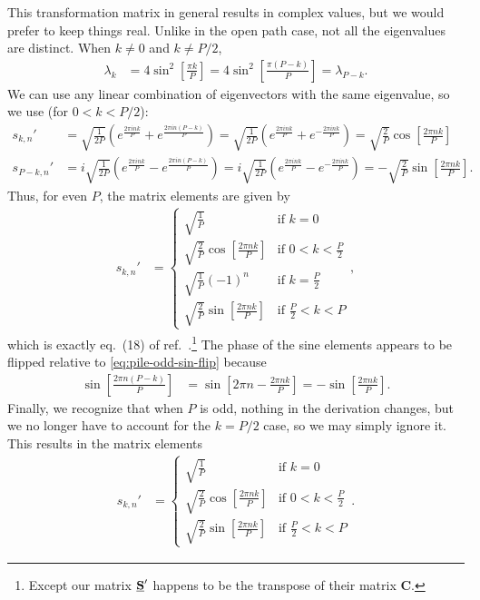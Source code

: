 This transformation matrix in general results in complex values, but we would prefer to keep things real.
Unlike in the open path case, not all the eigenvalues are distinct.
When $k \ne 0$ and $k \ne P/2$,
\begin{align}
	\lambda_k
	&= 4 \sin^2{\left[ \frac{\pi k}{P} \right]}
	= 4 \sin^2{\left[ \frac{\pi (P - k)}{P} \right]}
	= \lambda_{P-k}.
\end{align}
We can use any linear combination of eigenvectors with the same eigenvalue, so we use (for $0 < k < P/2$):
\begin{subequations}
\begin{align}
	s_{k,n}'
	&= \sqrt{\frac{1}{2 P}} \left( e^{\frac{2 \pi i n k}{P}} + e^{\frac{2 \pi i n (P - k)}{P}} \right)
	= \sqrt{\frac{1}{2 P}} \left( e^{\frac{2 \pi i n k}{P}} + e^{-\frac{2 \pi i n k}{P}} \right)
	= \sqrt{\frac{2}{P}} \cos{\left[ \frac{2 \pi n k}{P} \right]} \\
	s_{P-k,n}'
	&= i \sqrt{\frac{1}{2 P}} \left( e^{\frac{2 \pi i n k}{P}} - e^{\frac{2 \pi i n (P - k)}{P}} \right)
	= i \sqrt{\frac{1}{2 P}} \left( e^{\frac{2 \pi i n k}{P}} - e^{-\frac{2 \pi i n k}{P}} \right)
	= -\sqrt{\frac{2}{P}} \sin{\left[ \frac{2 \pi n k}{P} \right]}.
			\label{eq:pile-odd-sin-flip}
\end{align}
\end{subequations}
Thus, for even $P$, the matrix elements are given by
\begin{align}
	s_{k,n}'
	&= \begin{cases}
			\sqrt{\frac{1}{P}} & \text{if } k = 0 \\
			\sqrt{\frac{2}{P}} \cos{\left[ \frac{2 \pi n k}{P} \right]} & \text{if } 0 < k < \frac{P}{2} \\
			\sqrt{\frac{1}{P}} (-1)^n & \text{if } k = \frac{P}{2} \\
			\sqrt{\frac{2}{P}} \sin{\left[ \frac{2 \pi n k}{P} \right]} & \text{if } \frac{P}{2} < k < P
		\end{cases},
\end{align}
which is exactly eq.~(18) of ref.~\cite{ceriotti2010efficient}.\footnote{
	Except our matrix $\underline{\bm{\mathbf{S}}}'$ happens to be the transpose of their matrix $\mathbf{C}$.
}
The phase of the sine elements appears to be flipped relative to \cref{eq:pile-odd-sin-flip} because
\begin{align}
	\sin{\left[ \frac{2 \pi n (P - k)}{P} \right]}
	&= \sin{\left[ 2 \pi n - \frac{2 \pi n k}{P} \right]}
	= -\sin{\left[ \frac{2 \pi n k}{P} \right]}.
\end{align}
Finally, we recognize that when $P$ is odd, nothing in the derivation changes, but we no longer have to account for the $k = P/2$ case, so we may simply ignore it.
This results in the matrix elements
\begin{align}
	s_{k,n}'
	&= \begin{cases}
			\sqrt{\frac{1}{P}} & \text{if } k = 0 \\
			\sqrt{\frac{2}{P}} \cos{\left[ \frac{2 \pi n k}{P} \right]} & \text{if } 0 < k < \frac{P}{2} \\
			\sqrt{\frac{2}{P}} \sin{\left[ \frac{2 \pi n k}{P} \right]} & \text{if } \frac{P}{2} < k < P
		\end{cases}.
			\label{eq:pile-transformation-odd-P}
\end{align}
